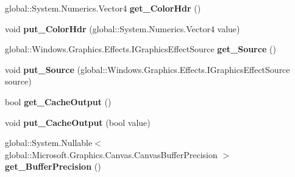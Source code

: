 \begin{DoxyCompactItemize}
\item 
\mbox{\label{class_microsoft_1_1_graphics_1_1_canvas_1_1_effects_1_1_vignette_effect_a5f188d64e25faa31b54a91c3dbb8be90}} 
global\+::\+System.\+Numerics.\+Vector4 {\bfseries get\+\_\+\+Color\+Hdr} ()
\item 
\mbox{\label{class_microsoft_1_1_graphics_1_1_canvas_1_1_effects_1_1_vignette_effect_aade688f3cc59d93bb8055c4041a67784}} 
void {\bfseries put\+\_\+\+Color\+Hdr} (global\+::\+System.\+Numerics.\+Vector4 value)
\item 
\mbox{\label{class_microsoft_1_1_graphics_1_1_canvas_1_1_effects_1_1_vignette_effect_a32e1b74fdd013067a372cf3cf5ac1d77}} 
global\+::\+Windows.\+Graphics.\+Effects.\+I\+Graphics\+Effect\+Source {\bfseries get\+\_\+\+Source} ()
\item 
\mbox{\label{class_microsoft_1_1_graphics_1_1_canvas_1_1_effects_1_1_vignette_effect_a790cec4778696909d732950890de8395}} 
void {\bfseries put\+\_\+\+Source} (global\+::\+Windows.\+Graphics.\+Effects.\+I\+Graphics\+Effect\+Source source)
\item 
\mbox{\label{class_microsoft_1_1_graphics_1_1_canvas_1_1_effects_1_1_vignette_effect_a280b2b24300647819979ccbcf4e5a342}} 
bool {\bfseries get\+\_\+\+Cache\+Output} ()
\item 
\mbox{\label{class_microsoft_1_1_graphics_1_1_canvas_1_1_effects_1_1_vignette_effect_a034b1c0d3009f5e0244c6d24b0c59785}} 
void {\bfseries put\+\_\+\+Cache\+Output} (bool value)
\item 
\mbox{\label{class_microsoft_1_1_graphics_1_1_canvas_1_1_effects_1_1_vignette_effect_add4fc5bc40b5de7c79c66ec5519927f0}} 
global\+::\+System.\+Nullable$<$ global\+::\+Microsoft.\+Graphics.\+Canvas.\+Canvas\+Buffer\+Precision $>$ {\bfseries get\+\_\+\+Buffer\+Precision} ()

\end{DoxyCompactItemize}
